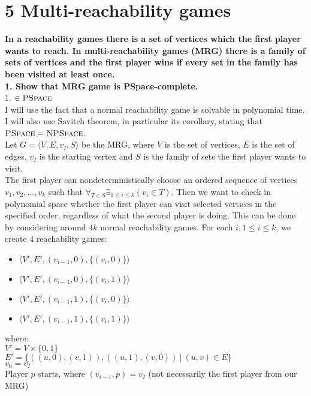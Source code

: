 \section*{5 Multi-reachability games}
\textbf{In a reachability games there is a set of vertices which the first player
wants to reach. In multi-reachability games (MRG) there is a family of
sets of vertices and the first player wins if every set in the family has been
visited at least once.\\
1. Show that MRG game is PSpace-complete.}\\
1. \underline{$\in \textsc{PSpace}$}\\
I will use the fact that a normal reachability game is solvable in polynomial time.
I will also use Savitch theorem, in particular its corollary, stating that
$\textsc{PSpace} = \textsc{NPSpace}$.\\
Let $G = \langle V, E, v_I, S \rangle$ be the MRG, where $V$ is the set of vertices,
$E$ is the set of edges, $v_I$ is the starting vertex and $S$ is the family of sets
the first player wants to visit.\\
The first player can nondeterministically choose an ordered sequence of vertices
$v_1, v_2, ..., v_k$ such that $\forall_{T \in S} \exists_{1 \leq i \leq k} (v_i \in T)$.
Then we want to check in polynomial space whether the first player can visit selected
vertices in the specified order, regardless of what the second player is doing.
This can be done by considering around $4k$ normal reachability games. For each $i, 1 \leq i \leq k$,
we create 4 reachability games:
\begin{itemize}
      \item $\langle V', E', (v_{i-1}, 0), \{ (v_i, 0) \} \rangle$
      \item $\langle V', E', (v_{i-1}, 0), \{ (v_i, 1) \} \rangle$
      \item $\langle V', E', (v_{i-1}, 1), \{ (v_i, 0) \} \rangle$
      \item $\langle V', E', (v_{i-1}, 1), \{ (v_i, 1) \} \rangle$
\end{itemize}
where:\\
$V' = V \times \{0,1\}$\\
$E' = \{ ((u,0), (v,1)), ((u,1),(v,0)) \ |\ (u, v) \in E \}$\\
$v_0 = v_I$\\
Player $p$ starts, where $(v_{i-1}, p) = v_I$ (not necessarily the first player from our MRG)\\

